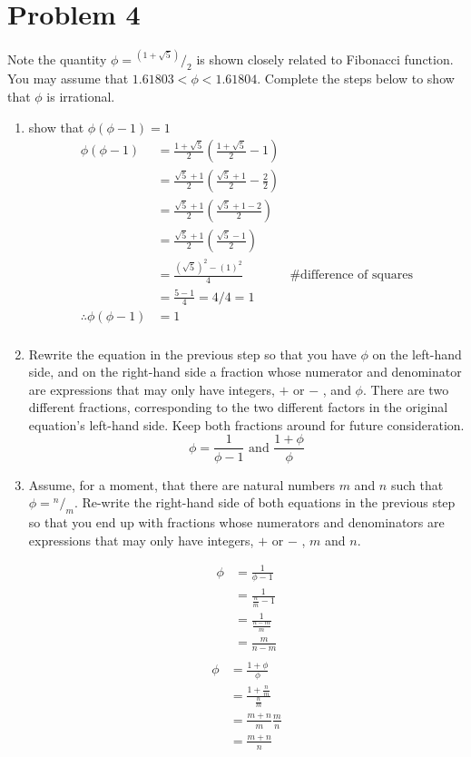 \documentclass[11pt]{article}
\theoremstyle{plain}%
\theoremstyle{definition}
\theoremstyle{remark}
\newcommand*\rfrac[2]{{}^{#1}\!/_{#2}}
\begin{document}
\section*{Problem 4}
Note the quantity $\phi = \rfrac{(1+\sqrt{5})}{2}$ is shown closely related to Fibonacci function. You may assume that $1.61803 < \phi < 1.61804$. Complete the steps below to show that $\phi$ is irrational.

\begin{enumerate}[label=\alph*]
  \item show that $\phi(\phi-1)=1$
  \begin{align*}
    \phi(\phi -1 )&= \frac{1+\sqrt{5}}{2} \left( \frac{1+\sqrt{5}}{2} - 1 \right) \\
    & = \frac{\sqrt{5}+1}{2} \left( \frac{\sqrt{5}+1}{2} - \frac{2}{2} \right)\\
    & = \frac{\sqrt{5}+1}{2} \left( \frac{\sqrt{5}+1-2}{2} \right)\\
    & = \frac{\sqrt{5}+1}{2} \left( \frac{\sqrt{5}-1}{2} \right)\\
    & = \frac{(\sqrt{5})^2-(1)^2}{4} &\#\text{difference of squares}\\
    & = \frac{5-1}{4} = 4/4 = 1\\
    \therefore \phi(\phi -1 ) &= 1\\
  \end{align*}

  \item Rewrite the equation in the previous step so that you have $\phi$  on the left-hand side, and on the right-hand side a fraction whose numerator and denominator are expressions that may only have integers, $+$ or $-$ , and $\phi$. There are two different fractions, corresponding to the two different factors in the original equation's left-hand side. Keep both fractions around for future consideration. \\

  \[
    \phi = \frac{1}{\phi-1} \text{ and } \frac{1+\phi}{\phi}
  \]

  \item Assume, for a moment, that there are natural numbers $m$ and $n$ such that $\phi = \rfrac{n}{m}$. Re-write the right-hand side of both equations in the previous step so that you end up with fractions whose numerators and denominators are expressions that may only have integers, $+$ or $-$ , $m$ and $n$.

  \begin{align*}
    \phi &= \frac{1}{\phi-1} \\
    &= \frac{1}{\frac{n}{m}-1} \\
    &= \frac{1}{\frac{n-m}{m}}\\
    &= \frac{m}{n-m}\\
  \end{align*}
  \begin{align*}
    \phi &= \frac{1+\phi}{\phi} \\
    &= \frac{1+\frac{n}{m}}{\frac{n}{m}}\\
    &= \frac{m+n}{m} \frac{m}{n}\\
    &= \frac{m+n}{n}\\
  \end{align*}


\end{enumerate}
\end{document}
